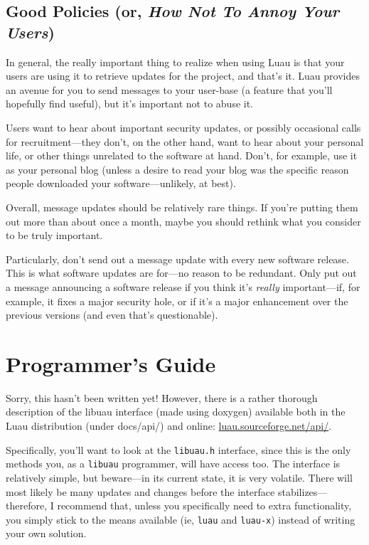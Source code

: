 \documentclass{report}
\begin{document}
\section{Good Policies (or, \emph{How Not To Annoy Your Users})}
\label{sec:goodpolicies}

In general, the really important thing to realize when using Luau is that your users are using it to retrieve updates for the project, and that's it.  Luau provides an avenue for you to send messages to your user-base (a feature that you'll hopefully find useful), but it's important not to abuse it.

Users want to hear about important security updates, or possibly occasional calls for recruitment---they don't, on the other hand, want to hear about your personal life, or other things unrelated to the software at hand.  Don't, for example, use it as your personal blog (unless a desire to read your blog was the specific reason people downloaded your software---unlikely, at best).

Overall, message updates should be relatively rare things.  If you're putting them out more than about once a month, maybe you should rethink what you consider to be truly important.

Particularly, don't send out a message update with every new software release.  This is what software updates are for---no reason to be redundant.  Only put out a message announcing a software release if you think it's \emph{really} important---if, for example, it fixes a major security hole, or if it's a major enhancement over the previous versions (and even that's questionable).

\chapter{Programmer's Guide}

Sorry, this hasn't been written yet!  However, there is a rather thorough description of the libuau interface (made using doxygen) available both in the Luau distribution (under docs/api/) and online: \href{http://luau.sourceforge.net/api/}{luau.sourceforge.net/api/}.

Specifically, you'll want to look at the \texttt{libuau.h} interface, since this is the only methods you, as a \texttt{libuau} programmer, will have access too.  The interface is relatively simple, but beware---in its current state, it is very volatile.  There will most likely be many updates and changes before the interface stabilizes---therefore, I recommend that, unless you specifically need to extra functionality, you simply stick to the means available (ie, \texttt{luau} and \texttt{luau-x}) instead of writing your own solution.
\end{document}
